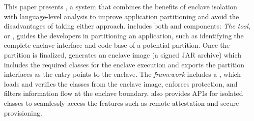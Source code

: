 
This paper presents {\em \sysname{}},
a system that combines the benefits of
\sgx{} enclave isolation with \java{} language-level analysis to improve application partitioning and %
avoid the disadvantages of taking either approach.
\sysname{} includes both \staticphase{} and \dynamicphase{} components:
{\em The \staticphase{} tool}, or {\em \statictool{}}, guides the developers in partitioning an application,
such as identifying the complete enclave interface and code base of a potential partition.
Once the partition is finalized, \statictool{} generates an enclave image (a signed JAR archive) which includes the required classes for the enclave execution and exports the partition interfaces as the entry points to the enclave.
The {\em \dynamicphase{} framework} includes a {\em \dynamicframework{}}, which loads and verifies the classes from the enclave image,
enforces \dynamicphase{} protection,
and filters information flow at the enclave boundary.
\dynamicframework{} also provides \java{} APIs for isolated classes to seamlessly access the \sgx{} features such as remote attestation and secure provisioning.
